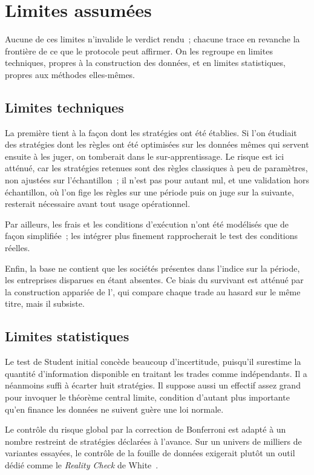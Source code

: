 \section{Limites assumées}
\label{sec:limites}

Aucune de ces limites n'invalide le verdict rendu~; chacune trace en revanche
la frontière de ce que le protocole peut affirmer. On les regroupe en limites
techniques, propres à la construction des données, et en limites statistiques,
propres aux méthodes elles-mêmes.

\subsection*{Limites techniques}

La première tient à la façon dont les stratégies ont été établies. Si l'on
étudiait des stratégies dont les règles ont été optimisées sur les données
mêmes qui servent ensuite à les juger, on tomberait dans le sur-apprentissage.
Le risque est ici atténué, car les stratégies retenues sont des règles
classiques à peu de paramètres, non ajustées sur l'échantillon~; il n'est pas
pour autant nul, et une validation hors échantillon, où l'on fige les règles
sur une période puis on juge sur la suivante, resterait nécessaire avant tout
usage opérationnel.

Par ailleurs, les frais et les conditions d'exécution n'ont été modélisés que
de façon simplifiée~; les intégrer plus finement rapprocherait le test des
conditions réelles.

Enfin, la base ne contient que les sociétés présentes dans l'indice sur la
période, les entreprises disparues en étant absentes. Ce biais du survivant
est atténué par la construction appariée de l'\edgevar{}, qui compare chaque
trade au hasard sur le même titre, mais il subsiste.

\subsection*{Limites statistiques}

Le test de Student initial concède beaucoup d'incertitude, puisqu'il surestime
la quantité d'information disponible en traitant les trades comme indépendants.
Il a néanmoins suffi à écarter huit stratégies. Il suppose aussi un effectif
assez grand pour invoquer le théorème central limite, condition d'autant plus
importante qu'en finance les données ne suivent guère une loi normale.

Le contrôle du risque global par la correction de Bonferroni est adapté à un
nombre restreint de stratégies déclarées à l'avance. Sur un univers de milliers
de variantes essayées, le contrôle de la fouille de données exigerait plutôt un
outil dédié comme le \emph{Reality Check} de White~\cite{white2000}.

